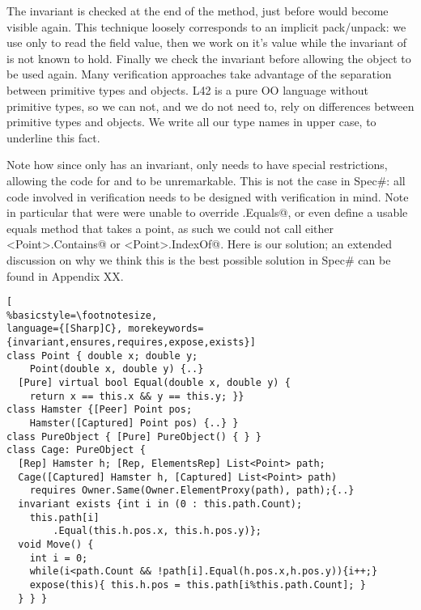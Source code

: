 The invariant is checked at the end of the \Q@moveTo@ method, just before \Q@this@ would become visible again.
This technique loosely corresponds to an implicit pack/unpack: we use \Q@this@ only to read the field value, then we work on it's value while the invariant of \Q@this@ is not known to hold. Finally we 
check the invariant before allowing the object to  be used again.
Many verification approaches take advantage of the separation between primitive types and objects.
L42 is a pure OO language without primitive types, so we can not, and we do not need to, rely
on differences between primitive types and objects.
We write all our type names in upper case, to underline this fact.


Note how since only \Q@Cage@ has an invariant,
only \Q@Cage@ needs to have special restrictions, allowing the code for \Q@Point@ and \Q@Hamster@ to be unremarkable.
This is not the case in Spec\#: all code involved in 
verification needs to be designed with verification in mind.
Note in particular that were were unable to override \Q@Object.Equals@, or even define a usable equals method that takes a point, as such we could not call either \Q@List<Point>.Contains@ or \Q@List<Point>.IndexOf@. Here is our solution; an extended discussion on why we think this is the best possible solution in Spec\# can be found in Appendix XX.
\begin{lstlisting}[
%basicstyle=\footnotesize,
language={[Sharp]C}, morekeywords={invariant,ensures,requires,expose,exists}]
class Point { double x; double y;
	Point(double x, double y) {..}
  [Pure] virtual bool Equal(double x, double y) {
    return x == this.x && y == this.y; }}
class Hamster {[Peer] Point pos;
	Hamster([Captured] Point pos) {..} }
class PureObject { [Pure] PureObject() { } }
class Cage: PureObject {
  [Rep] Hamster h; [Rep, ElementsRep] List<Point> path;
  Cage([Captured] Hamster h, [Captured] List<Point> path)
    requires Owner.Same(Owner.ElementProxy(path), path);{..}
  invariant exists {int i in (0 : this.path.Count);
    this.path[i]
		.Equal(this.h.pos.x, this.h.pos.y)};
  void Move() {
    int i = 0;
    while(i<path.Count && !path[i].Equal(h.pos.x,h.pos.y)){i++;}
    expose(this){ this.h.pos = this.path[i%this.path.Count]; }
  } } }
\end{lstlisting}

